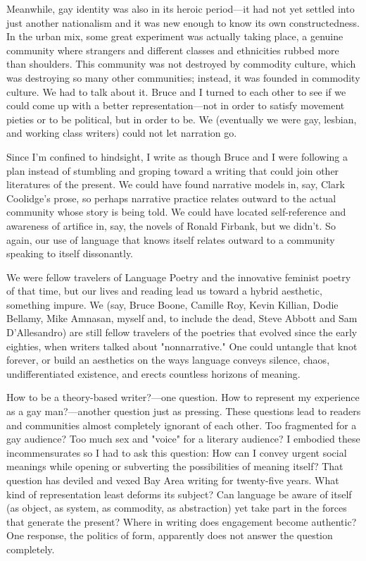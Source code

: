 Meanwhile, gay identity was also in its heroic period---it had not yet
settled into just another nationalism and it was new enough to know its
own constructedness. In the urban mix, some great experiment was
actually taking place, a genuine community where strangers and different
classes and ethnicities rubbed more than shoulders. This community was
not destroyed by commodity culture, which was destroying so many other
communities; instead, it was founded in commodity culture. We had to
talk about it. Bruce and I turned to each other to see if we could come
up with a better representation---not in order to satisfy movement
pieties or to be political, but in order to be. We (eventually we were
gay, lesbian, and working class writers) could not let narration go.

Since I'm confined to hindsight, I write as though Bruce and I were
following a plan instead of stumbling and groping toward a writing that
could join other literatures of the present. We could have found
narrative models in, say, Clark Coolidge's prose, so perhaps narrative
practice relates outward to the actual community whose story is being
told. We could have located self-reference and awareness of artifice in,
say, the novels of Ronald Firbank, but we didn't. So again, our use of
language that knows itself relates outward to a community speaking to
itself dissonantly.

We were fellow travelers of Language Poetry and the innovative feminist
poetry of that time, but our lives and reading lead us toward a hybrid
aesthetic, something impure. We (say, Bruce Boone, Camille Roy, Kevin
Killian, Dodie Bellamy, Mike Amnasan, myself and, to include the dead,
Steve Abbott and Sam D'Allesandro) are still fellow travelers of the
poetries that evolved since the early eighties, when writers talked
about "nonnarrative." One could untangle that knot forever, or build an
aesthetics on the ways language conveys silence, chaos, undifferentiated
existence, and erects countless horizons of meaning.

How to be a theory-based writer?---one question. How to represent my
experience as a gay man?---another question just as pressing. These
questions lead to readers and communities almost completely ignorant of
each other. Too fragmented for a gay audience? Too much sex and "voice"
for a literary audience? I embodied these incommensurates so I had to
ask this question: How can I convey urgent social meanings while opening
or subverting the possibilities of meaning itself? That question has
deviled and vexed Bay Area writing for twenty-five years. What kind of
representation least deforms its subject? Can language be aware of
itself (as object, as system, as commodity, as abstraction) yet take
part in the forces that generate the present? Where in writing does
engagement become authentic? One response, the politics of form,
apparently does not answer the question completely.

